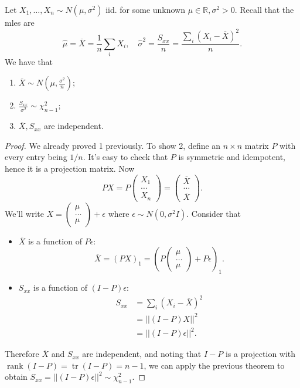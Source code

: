 \documentclass[egregdoesnotlikesansseriftitles,a4paper]{scrartcl}
\begin{document}
\begin{theorem}
     Let $X_1 , \ldots, X_n \sim N (\mu, \sigma^2)$ iid. for some unknown $\mu \in \mathbb{R}, \sigma^2>0$. Recall that the mles are \[
          \hat{\mu}= \overline{X}= \frac{1}{n} \sum_{i}^{}X_{i}, \quad \hat{\sigma}^2= \frac{S_{xx}}{n}= \frac{\sum_{i}^{}(X_{i}-\overline{X})^2}{n}
     .\] We have that 
     \begin{enumerate}
          \item $\overline{X} \sim N (\mu, \frac{\sigma^2}{n})$;
          \item $ \frac{S_{xx}}{\sigma^2} \sim \chi^2_{n-1}$;
          \item $\overline{X}, S_{xx}$ are independent.
     \end{enumerate}
     \begin{proof}
           We already proved 1 previously. To show 2, define an $n \times n$ matrix $P$ with every entry being $1/n$. It's easy to check that $P$ is symmetric and idempotent, hence it is a projection matrix. Now \[
           PX =P \begin{pmatrix} X_1 \\ \ldots \\ X_n \end{pmatrix}= \begin{pmatrix} \overline{X} \\\ldots \\\overline{X} \end{pmatrix}
           .\] We'll write $X= \begin{pmatrix} \mu\\ \ldots\\ \mu \end{pmatrix}+\epsilon$ where $\epsilon \sim N (0, \sigma^2 I)$. Consider that 
           \begin{itemize}
                \item $\overline{X}$ is a function of $P \epsilon$: \[
                \overline{X}= (PX)_{1}= (P \begin{pmatrix} \mu\\ \ldots\\ \mu \end{pmatrix}+ P \epsilon)_1
                .\] 
                \item $S_{xx}$ is a function of $(I-P) \epsilon$:
                \begin{align*}
                     S_{xx}&= \sum_{i}^{}(X_i-\overline{X})^2\\
                     &= \left|| (I-P)X\right||^2\\
                     &= \left|| (I-P) \epsilon\right||^2.
                \end{align*}
           \end{itemize}
           Therefore $\overline{X}$ and $S_{xx}$ are independent, and noting that $I-P$ is a projection with $\operatorname{rank}(I-P)=\operatorname{tr}(I-P) = n-1$, we can apply the previous theorem to obtain $S_{xx}= \left||(I-P) \epsilon \right|| ^2 \sim \chi^2_{n-1}$.
     \end{proof}
\end{theorem}
\end{document}
